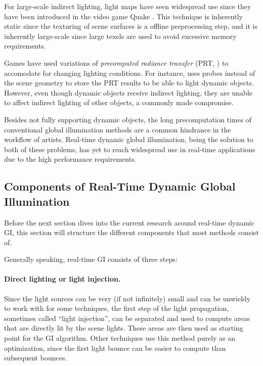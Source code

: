 For large-scale indirect lighting, light maps have seen widespread use since they have been introduced in the video game Quake \citep{Abrash:1997:BlackBook}. This technique is inherently static since the texturing of scene surfaces is a offline preprocessing step, and it is inherently large-scale since large texels are used to avoid excessive memory requirements.

Games have used variations of \emph{precomputed radiance transfer} (PRT, \cite{sloan:2002:PRT}) to accomodate for changing lighting conditions. For instance, \citet{stefanov:2012:PRTinFarCry3} uses probes instead of the scene geometry to store the PRT results to be able to light dynamic objects. However, even though dynamic objects receive indirect lighting, they are unable to affect indirect lighting of other objects, a commonly made compromise.

Besides not fully supporting dynamic objects, the long precomputation times of conventional global illumination methods are a common hindrance in the workflow of artists. Real-time dynamic global illumination, being the solution to both of these problems, has yet to reach widespread use in real-time applications due to the high performance requirements.


\subsection{Components of Real-Time Dynamic Global Illumination}
\label{sec:intro:gi:components}

Before the next section dives into the current research around real-time dynamic GI, this section will structure the different components that most methods consist of.

Generally speaking, real-time GI consists of three steps:

\paragraph{Direct lighting or light injection.}
Since the light sources can be very (if not infinitely) small and can be unwieldy to work with for some techniques, the first step of the light propagation, sometimes called ``light injection'', can be separated and used to compute areas that are directly lit by the scene lights. These areas are then used as starting point for the GI algorithm. Other techniques use this method purely as an optimization, since the first light bounce can be easier to compute than subsequent bounces.

